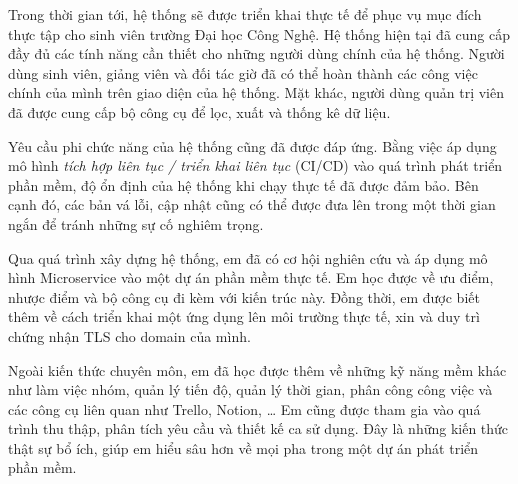 \documentclass[./../main.tex]{subfiles}
\begin{document}
Trong thời gian tới, hệ thống sẽ được triển khai thực tế để phục vụ mục
đích thực tập cho sinh viên trường Đại học Công Nghệ. Hệ thống hiện tại
đã cung cấp đầy đủ các tính năng cần thiết cho những người dùng chính
của hệ thống. Người dùng sinh viên, giảng viên và đối tác giờ đã có thể
hoàn thành các công việc chính của mình trên giao diện của hệ thống. Mặt
khác, người dùng quản trị viên đã được cung cấp bộ công cụ để lọc, xuất
và thống kê dữ liệu.

Yêu cầu phi chức năng của hệ thống cũng đã được đáp ứng. Bằng việc áp
dụng mô hình \emph{tích hợp liên tục / triển khai liên tục} (CI/CD) vào
quá trình phát triển phần mềm, độ ổn định của hệ thống khi chạy thực tế
đã được đảm bảo. Bên cạnh đó, các bản vá lỗi, cập nhật cũng có thể được
đưa lên trong một thời gian ngắn để tránh những sự cố nghiêm trọng.

Qua quá trình xây dựng hệ thống, em đã có cơ hội nghiên cứu và áp dụng
mô hình Microservice vào một dự án phần mềm thực tế. Em học được về ưu
điểm, nhược điểm và bộ công cụ đi kèm với kiến trúc này. Đồng thời, em
được biết thêm về cách triển khai một ứng dụng lên môi trường thực tế,
xin và duy trì chứng nhận TLS cho domain của mình.

Ngoài kiến thức chuyên môn, em đã học được thêm về những kỹ năng mềm
khác như làm việc nhóm, quản lý tiến độ, quản lý thời gian, phân công
công việc và các công cụ liên quan như Trello, Notion, \ldots{} Em cũng
được tham gia vào quá trình thu thập, phân tích yêu cầu và thiết kế ca
sử dụng. Đây là những kiến thức thật sự bổ ích, giúp em hiểu sâu hơn về
mọi pha trong một dự án phát triển phần mềm.
\end{document}
